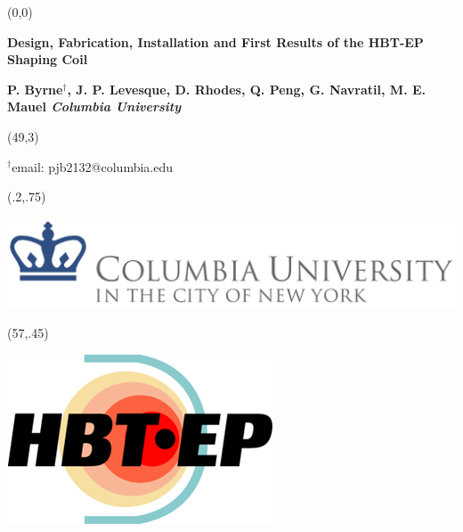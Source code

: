 \documentclass{article}
\begin{document}

%
%

\begin{textblock}{62}(0,0)


\begin{center}

\vspace{5mm}\def\myfig#1{\begin{center}\texttt{[image: \#1]}\end{center}}

{\VeryHuge\color{black} \textbf{Design, Fabrication, Installation and First Results of the HBT-EP Shaping Coil}}

\vspace{15mm}
\rm
\sf
\LARGE\textbf{\color{lnavy}
P. Byrne$^\dagger$, J. P. Levesque, D. Rhodes, Q. Peng, G. Navratil, M. E. Mauel \hspace{2in} \emph{Columbia University}}\\

\vspace{5mm}

\end{center}
\end{textblock}
\begin{textblock}{12}(49,3)
\begin{flushright}

{\color{black}$^{\dagger}$email: {pjb2132@columbia.edu} }\hspace{.25in}

\end{flushright}
\end{textblock}

\begin{textblock}{3}(.2,.75)

\includegraphics[scale =.75]{CU_logo_exported.png}

\end{textblock}


\begin{textblock}{1}(57,.45)

\includegraphics[scale =1]{hbt_logo.png}

\end{textblock}
\end{document}
